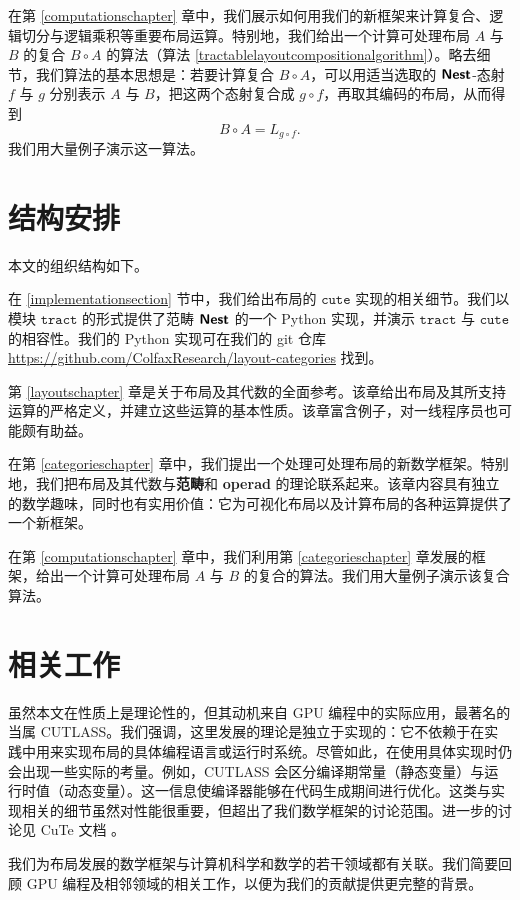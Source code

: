 在第 \ref{computationschapter} 章中，我们展示如何用我们的新框架来计算复合、逻辑切分与逻辑乘积等重要布局运算。特别地，我们给出一个计算可处理布局 $A$ 与 $B$ 的复合 $B \circ A$ 的算法（算法 \ref{tractablelayoutcompositionalgorithm}）。略去细节，我们算法的基本思想是：若要计算复合 $B \circ A$，可以用适当选取的 ${\boldsymbol{\mathsf{Nest}}}$-态射 $f$ 与 $g$ 分别表示 $A$ 与 $B$，把这两个态射复合成 $g \circ f$，再取其编码的布局，从而得到
\[
B \circ A = L_{g \circ f}.
\]
我们用大量例子演示这一算法。

\section{结构安排}

本文的组织结构如下。

在 \ref{implementationsection} 节中，我们给出布局的 $\texttt{cute}$ 实现的相关细节。我们以模块 $\texttt{tract}$ 的形式提供了范畴 ${\boldsymbol{\mathsf{Nest}}}$ 的一个 Python 实现，并演示 $\texttt{tract}$ 与 $\texttt{cute}$ 的相容性。我们的 Python 实现可在我们的 git 仓库 \url{https://github.com/ColfaxResearch/layout-categories} 找到。

第 \ref{layoutschapter} 章是关于布局及其代数的全面参考。该章给出布局及其所支持运算的严格定义，并建立这些运算的基本性质。该章富含例子，对一线程序员也可能颇有助益。

在第 \ref{categorieschapter} 章中，我们提出一个处理可处理布局的新数学框架。特别地，我们把布局及其代数与{\bf 范畴}和 {\bf operad} 的理论联系起来。该章内容具有独立的数学趣味，同时也有实用价值：它为可视化布局以及计算布局的各种运算提供了一个新框架。

在第 \ref{computationschapter} 章中，我们利用第 \ref{categorieschapter} 章发展的框架，给出一个计算可处理布局 $A$ 与 $B$ 的复合的算法。我们用大量例子演示该复合算法。

\section{相关工作}

虽然本文在性质上是理论性的，但其动机来自 GPU 编程中的实际应用，最著名的当属 CUTLASS。我们强调，这里发展的理论是独立于实现的：它不依赖于在实践中用来实现布局的具体编程语言或运行时系统。尽管如此，在使用具体实现时仍会出现一些实际的考量。例如，CUTLASS 会区分编译期常量（静态变量）与运行时值（动态变量）。这一信息使编译器能够在代码生成期间进行优化。这类与实现相关的细节虽然对性能很重要，但超出了我们数学框架的讨论范围。进一步的讨论见 CuTe 文档 \cite{cutedocumentation}。

我们为布局发展的数学框架与计算机科学和数学的若干领域都有关联。我们简要回顾 GPU 编程及相邻领域的相关工作，以便为我们的贡献提供更完整的背景。


